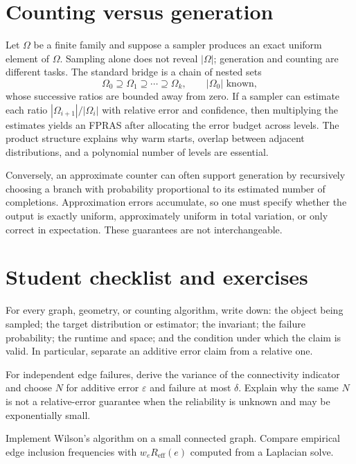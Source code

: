 \section{Counting versus generation}

Let $\Omega$ be a finite family and suppose a sampler produces an exact
uniform element of $\Omega$.  Sampling alone does not reveal $|\Omega|$;
generation and counting are different tasks.  The standard bridge is a chain
of nested sets
\[
 \Omega_0\supseteq\Omega_1\supseteq\cdots\supseteq\Omega_k,
 \qquad |\Omega_0|\text{ known},
\]
whose successive ratios are bounded away from zero.  If a sampler can estimate
each ratio $|\Omega_{i+1}|/|\Omega_i|$ with relative error and confidence,
then multiplying the estimates yields an FPRAS after allocating the error
budget across levels.  The product structure explains why warm starts,
overlap between adjacent distributions, and a polynomial number of levels are
essential.

Conversely, an approximate counter can often support generation by recursively
choosing a branch with probability proportional to its estimated number of
completions.  Approximation errors accumulate, so one must specify whether
the output is exactly uniform, approximately uniform in total variation, or
only correct in expectation.  These guarantees are not interchangeable.

\section{Student checklist and exercises}

For every graph, geometry, or counting algorithm, write down: the object being
sampled; the target distribution or estimator; the invariant; the failure
probability; the runtime and space; and the condition under which the claim is
valid.  In particular, separate an additive error claim from a relative one.

\begin{problem}[Reliability]
For independent edge failures, derive the variance of the connectivity
indicator and choose $N$ for additive error $\varepsilon$ and failure at most
$\delta$.  Explain why the same $N$ is not a relative-error guarantee when
the reliability is unknown and may be exponentially small.
\end{problem}

\begin{problem}
Implement Wilson's algorithm on a small connected graph.  Compare empirical
edge inclusion frequencies with $w_eR_{\mathrm{eff}}(e)$ computed from a
Laplacian solve.
\end{problem}

